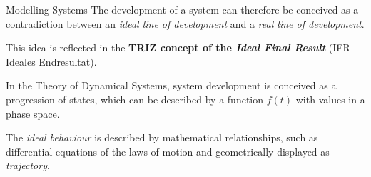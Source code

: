 \documentclass{beamer}
\begin{document}

\begin{frame}{Modelling Systems}
  The development of a system can therefore be conceived as a contradiction
  between an \emph{ideal line of development} and a \emph{real line of
    development}.

This idea is reflected in the \textbf{TRIZ concept of the \emph{Ideal Final
    Result}} (IFR -- Ideales Endresultat).

In the Theory of Dynamical Systems, system development is conceived as a
progression of states, which can be described by a function $f(t)$ with values
in a phase space.

The \emph{ideal behaviour} is described by mathematical relationships, such as
differential equations of the laws of motion and geometrically displayed as
\emph{trajectory}. 

\end{frame}
\end{document}
